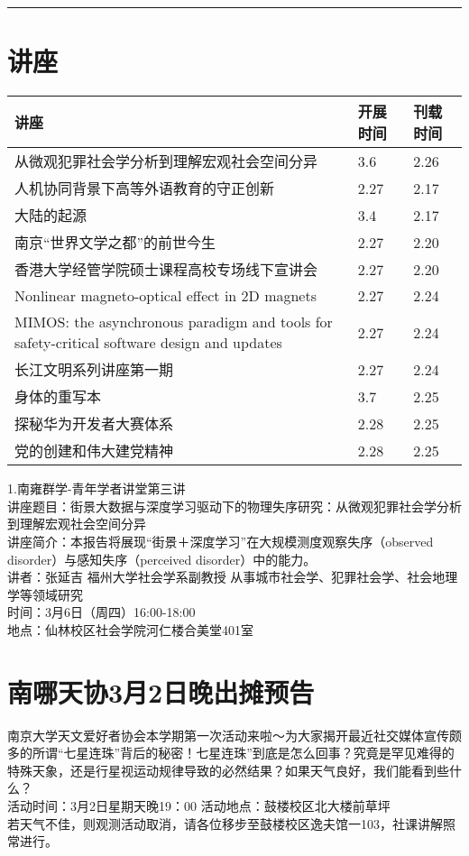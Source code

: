 \documentclass[letterpaper, 12pt]{article}
\begin{document}
\hrule
\pagebreak
\begin{multicols}{2}

\section{讲座}
\begin{tabular}{|>{\centering\arraybackslash}m{}|m{}|m{}|}
    \hline
    讲座 & 开展时间 & 刊载时间\\
    \hline\hline
    从微观犯罪社会学分析到理解宏观社会空间分异   &3.6  &2.26 \\\hline
    人机协同背景下高等外语教育的守正创新 & 2.27 & 2.17\\\hline
    大陆的起源 & 3.4 & 2.17\\\hline
    南京“世界文学之都”的前世今生 & 2.27 & 2.20\\\hline
    香港大学经管学院硕士课程高校专场线下宣讲会 & 2.27 & 2.20\\\hline
    Nonlinear magneto-optical effect in 2D magnets & 2.27&2.24\\\hline
    MIMOS: the asynchronous paradigm and tools for safety-critical software design and updates & 2.27 & 2.24\\\hline
    长江文明系列讲座第一期 & 2.27 & 2.24\\\hline
    身体的重写本 & 3.7 & 2.25\\\hline
    探秘华为开发者大赛体系 & 2.28 & 2.25\\\hline
    党的创建和伟大建党精神 & 2.28 & 2.25\\\hline
\end{tabular}
1.南雍群学-青年学者讲堂第三讲\\
讲座题目：街景大数据与深度学习驱动下的物理失序研究：从微观犯罪社会学分析到理解宏观社会空间分异\\
讲座简介：本报告将展现“街景＋深度学习”在大规模测度观察失序（observed disorder）与感知失序（perceived disorder）中的能力。\\
讲者：张延吉 福州大学社会学系副教授 从事城市社会学、犯罪社会学、社会地理学等领域研究\\
时间：3月6日（周四）16:00-18:00\\
地点：仙林校区社会学院河仁楼合美堂401室\\

\section{南哪天协3月2日晚出摊预告}
南京大学天文爱好者协会本学期第一次活动来啦～为大家揭开最近社交媒体宣传颇多的所谓“七星连珠”背后的秘密！七星连珠”到底是怎么回事？究竟是罕见难得的特殊天象，还是行星视运动规律导致的必然结果？如果天气良好，我们能看到些什么？\\
活动时间：3月2日星期天晚19：00 活动地点：鼓楼校区北大楼前草坪\\
若天气不佳，则观测活动取消，请各位移步至鼓楼校区逸夫馆一103，社课讲解照常进行。\\


\end{multicols}
\end{document}
